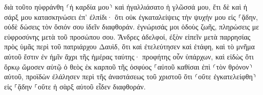 \documentclass{openreader}
\begin{document}
διὰ τοῦτο ηὐφράνθη ⸂ἡ καρδία μου⸃ καὶ ἠγαλλιάσατο ἡ γλῶσσά μου, ἔτι δὲ καὶ ἡ σάρξ μου κατασκηνώσει ἐπ’ ἐλπίδι· 
ὅτι οὐκ ἐγκαταλείψεις τὴν ψυχήν μου εἰς ⸀ᾅδην, οὐδὲ δώσεις τὸν ὅσιόν σου ἰδεῖν διαφθοράν. 
ἐγνώρισάς μοι ὁδοὺς ζωῆς, πληρώσεις με εὐφροσύνης μετὰ τοῦ προσώπου σου. 
Ἄνδρες ἀδελφοί, ἐξὸν εἰπεῖν μετὰ παρρησίας πρὸς ὑμᾶς περὶ τοῦ πατριάρχου Δαυὶδ, ὅτι καὶ ἐτελεύτησεν καὶ ἐτάφη, καὶ τὸ μνῆμα αὐτοῦ ἔστιν ἐν ἡμῖν ἄχρι τῆς ἡμέρας ταύτης· 
προφήτης οὖν ὑπάρχων, καὶ εἰδὼς ὅτι ὅρκῳ ὤμοσεν αὐτῷ ὁ θεὸς ἐκ καρποῦ τῆς ὀσφύος ⸀αὐτοῦ καθίσαι ἐπὶ ⸂τὸν θρόνον⸃ αὐτοῦ, 
προϊδὼν ἐλάλησεν περὶ τῆς ἀναστάσεως τοῦ χριστοῦ ὅτι ⸂οὔτε ἐγκατελείφθη⸃ εἰς ⸀ᾅδην ⸀οὔτε ἡ σὰρξ αὐτοῦ εἶδεν διαφθοράν. 
\end{document}
